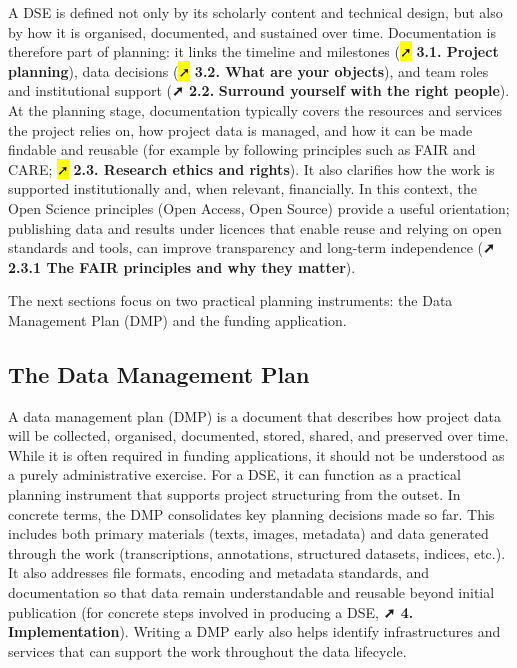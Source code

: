 \documentclass[
  letterpaper,
  DIV=11,
  numbers=noendperiod]{scrreprt}
\begin{document}
A DSE is defined not only by its scholarly content and technical design,
but also by how it is organised, documented, and sustained over time.
Documentation is therefore part of planning: it links the timeline and
milestones (\hl{➚} \textbf{3.1. Project planning}), data decisions
(\hl{➚} \textbf{3.2. What are your objects}), and team roles and
institutional support (\textbf{➚ 2.2.} \textbf{Surround yourself with
the right people}). At the planning stage, documentation typically
covers the resources and services the project relies on, how project
data is managed, and how it can be made findable and reusable (for
example by following principles such as FAIR and CARE; \hl{➚}
\textbf{2.3. Research ethics and rights}). It also clarifies how the
work is supported institutionally and, when relevant, financially. In
this context, the Open Science principles (Open Access, Open Source)
provide a useful orientation; publishing data and results under licences
that enable reuse and relying on open standards and tools, can improve
transparency and long-term independence (\textbf{➚ 2.3.1 The FAIR
principles and why they matter}).

The next sections focus on two practical planning instruments: the Data
Management Plan (DMP) and the funding application.

\subsection{The Data Management Plan}\label{the-data-management-plan}

A data management plan (DMP) is a document that describes how project
data will be collected, organised, documented, stored, shared, and
preserved over time. While it is often required in funding applications,
it should not be understood as a purely administrative exercise. For a
DSE, it can function as a practical planning instrument that supports
project structuring from the outset. In concrete terms, the DMP
consolidates key planning decisions made so far. This includes both
primary materials (texts, images, metadata) and data generated through
the work (transcriptions, annotations, structured datasets, indices,
etc.). It also addresses file formats, encoding and metadata standards,
and documentation so that data remain understandable and reusable beyond
initial publication (for concrete steps involved in producing a DSE,
\textbf{➚ 4. Implementation}). Writing a DMP early also helps identify
infrastructures and services that can support the work throughout the
data lifecycle.
\end{document}
